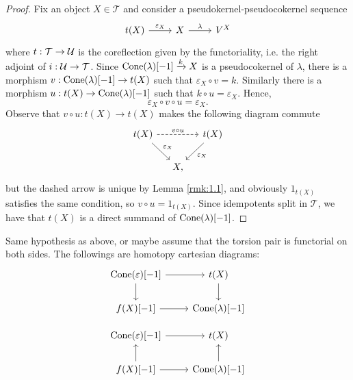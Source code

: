 \begin{proof}
  Fix an object $X\in\mathcal{T}$ and consider a pseudokernel-pseudocokernel sequence
  \begin{equation*}
    \begin{tikzcd}
      t(X)\arrow{r}{\varepsilon_X}& X\arrow{r}{\lambda}&V^X
    \end{tikzcd}
  \end{equation*}
  where $t:\mathcal{T} \to\mathcal{U}$ is the coreflection given by the functoriality, i.e. the right adjoint of $i:\mathcal{U}\to \mathcal{T}$. Since $\operatorname{Cone}(\lambda)[-1]\xrightarrow{k}X$ is a pseudocokernel of $\lambda$, there is a morphism $v:\operatorname{Cone}(\lambda)[-1]\to t(X)$ such that $\varepsilon_X\circ v= k$. Similarly there is a morphism $u:t(X)\to\operatorname{Cone}(\lambda)[-1]$ such that $k\circ u=\varepsilon_X$. Hence,
  \begin{equation*}
    \varepsilon_X\circ v\circ u= \varepsilon_X.
  \end{equation*}
  Observe that $v\circ u\colon t(X)\to t(X)$ makes the following diagram commute
  \begin{equation*}
    \begin{tikzcd}[column sep=small]
      t(X)\arrow[dashed]{rr}{v\circ u}\arrow{dr}{\varepsilon_X}
      &&t(X)\arrow{dl}{\varepsilon_X}\\
      & X,&
    \end{tikzcd}
  \end{equation*}
  but the dashed arrow is unique by Lemma \ref{rmk:1.1}, and obviously $1_{t(X)}$ satisfies the same condition, so $v\circ u=1_{t(X)}$. Since idempotents split in $\mathcal{T}$, we have that $t(X)$ is a direct summand of $\operatorname{Cone}(\lambda)[-1]$.
\end{proof}

\begin{lemma}
  Same hypothesis as above, or maybe assume that the torsion pair is functorial on both sides. The followings are homotopy cartesian diagrams:
  \begin{equation*}
    \begin{tikzcd}
      \Cone(\varepsilon)[-1]\arrow{r}\arrow{d}&t(X)\arrow{d}\\
      f(X)[-1]\arrow{r}&\Cone(\lambda)[-1]
    \end{tikzcd}
  \end{equation*}

  \begin{equation*}
    \begin{tikzcd}
      \Cone(\varepsilon)[-1]\arrow{r}&t(X)\\
      f(X)[-1]\arrow{r}\arrow{u}&\Cone(\lambda)[-1]\arrow{u}
    \end{tikzcd}
  \end{equation*}
\end{lemma}


